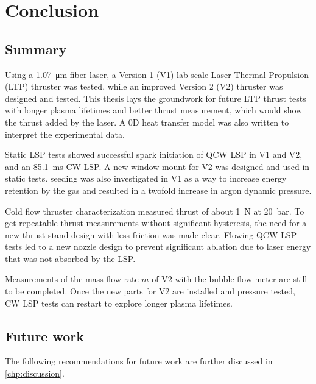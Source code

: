 \chapter{Conclusion}
    \section{Summary}

        Using a \qty{1.07}{μm} fiber laser, a Version 1 (V1) lab-scale Laser Thermal Propulsion (LTP) thruster was tested, while an improved Version 2 (V2) thruster was designed and tested. This thesis lays the groundwork for future LTP thrust tests with longer plasma lifetimes and better thrust measurement, which would show the thrust added by the laser. A 0D heat transfer model was also written to interpret the experimental data.

        Static LSP tests showed successful spark initiation of QCW LSP in V1 and V2, and an \qty{85.1}{ms} CW LSP. A new window mount for V2 was designed and used in static tests.  seeding was also investigated in V1 as a way to increase energy retention by the gas and resulted in a twofold increase in argon dynamic pressure. 

        Cold flow thruster characterization measured thrust of about \qty{1}{N} at \qty{20}{bar}. To get repeatable thrust measurements without significant hysteresis, the need for a new thrust stand design with less friction was made clear. Flowing QCW LSP tests led to a new nozzle design to prevent significant ablation due to laser energy that was not absorbed by the LSP. 
        
        Measurements of the mass flow rate $\dot m$ of V2 with the bubble flow meter are still to be completed. Once the new parts for V2 are installed and pressure tested, CW LSP tests can restart to explore longer plasma lifetimes.

    \section{Future work}

        The following recommendations for future work are further discussed in \autoref{chp:discussion}.
        
